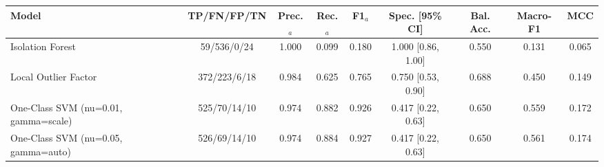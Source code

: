 \begin{tabular}{lcccccccc}
\toprule
Model & TP/FN/FP/TN & Prec.$_a$ & Rec.$_a$ & F1$_a$ & Spec. [95\% CI] & Bal. Acc. & Macro-F1 & MCC \\
\midrule
Isolation Forest & 59/536/0/24 & 1.000 & 0.099 & 0.180 & 1.000 [0.86, 1.00] & 0.550 & 0.131 & 0.065 \\
Local Outlier Factor & 372/223/6/18 & 0.984 & 0.625 & 0.765 & 0.750 [0.53, 0.90] & 0.688 & 0.450 & 0.149 \\
One-Class SVM (nu=0.01, gamma=scale) & 525/70/14/10 & 0.974 & 0.882 & 0.926 & 0.417 [0.22, 0.63] & 0.650 & 0.559 & 0.172 \\
One-Class SVM (nu=0.05, gamma=auto) & 526/69/14/10 & 0.974 & 0.884 & 0.927 & 0.417 [0.22, 0.63] & 0.650 & 0.561 & 0.174 \\
\bottomrule
\end{tabular}

